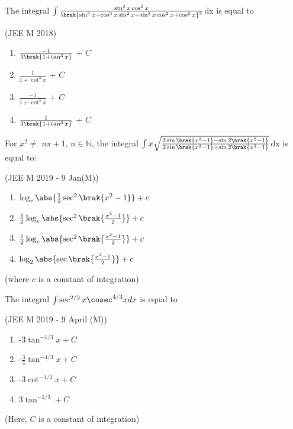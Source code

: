 	\item The integral $\int\frac{\sin^2x\cos^2x}{\brak{\sin^5x+\cos^3x\sin^2x+\sin^3x\cos^2x+\cos^5x}^2}$dx is equal to

		\hfill{(JEE M 2018)}
		
		\begin{multicols}{2}
			\begin{enumerate}
				\item $\frac{-1}{3\brak{1+\tan ^3x}}$ + $C$
				\item $\frac{1}{1+\cot ^3x}$ + $C$
				\item $\frac{-1}{1+\cot ^3x}$ + $C$
				\item $\frac{1}{3\brak{1+\tan ^3x}}$ + $C$
			\end{enumerate}
		\end{multicols}
		
	\item For $x^2\neq$ $n\pi+1$, $n\in \mathbb{N}$, the integral $\int x\sqrt{\frac{2\sin \brak{x^2-1}-\sin 2\brak{x^2-1}}{2\sin \brak{x^2-1}+\sin 2\brak{x^2-1}}}$dx is equal to:

		\hfill{(JEE M 2019 - 9 Jan(M))}

		\begin{multicols}{1}
			\begin{enumerate}
				\item $\log_e\abs{\frac{1}{2}\sec ^2\brak{x^2-1}} + c$
				\item $\frac{1}{2}\log_e\abs{\sec ^2\brak{\frac{x^2-1}{2}}} + c$
				\item $\frac{1}{2}\log_e\abs{\sec ^2\brak{\frac{x^2-1}{2}}} + c$
				\item $\log_2\abs{\sec \brak{\frac{x^2-1}{2}}} + c$
			\end{enumerate}
		\end{multicols}
		(where $c$ is a constant of integration)

	\item The integral $\int \sec ^{2/3}x\cosec ^{4/3}x dx$ is equal to

		\hfill{(JEE M 2019 - 9 April (M))}

		\begin{multicols}{2}
			\begin{enumerate}
				\item -3$\tan ^{-1/3}x+C$
				\item -$\frac{3}{4}\tan ^{-4/3}x+C$
				\item -3$\cot ^{-1/3}x+C$
				\item 3$\tan ^{-1/3}+C$
			\end{enumerate}
		\end{multicols}
		(Here, $C$ is a constant of integration)

